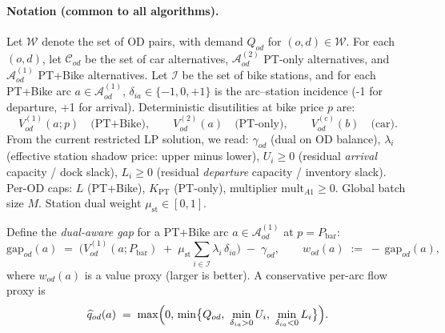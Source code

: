 \documentclass[11pt,a4paper]{article}
\begin{document}
\paragraph{Notation (common to all algorithms).}
Let $\mathcal{W}$ denote the set of OD pairs, with demand $Q_{od}$ for $(o,d)\in\mathcal{W}$.
For each $(o,d)$, let $\mathcal{C}_{od}$ be the set of car alternatives,
$\mathcal{A}^{(2)}_{od}$ PT-only alternatives, and $\mathcal{A}^{(1)}_{od}$ PT+Bike alternatives.
Let $\mathcal{I}$ be the set of bike stations, and for each PT+Bike arc $a\in\mathcal{A}^{(1)}_{od}$,
$\delta_{ia}\in\{-1,0,+1\}$ is the arc--station incidence (-1 for departure, +1 for arrival).
Deterministic disutilities at bike price $p$ are:
\[
V^{(1)}_{od}(a;p)\quad\text{(PT+Bike)},\qquad
V^{(2)}_{od}(a)\quad\text{(PT-only)},\qquad
V^{(c)}_{od}(b)\quad\text{(car)}.
\]
From the current restricted LP solution, we read:
$\gamma_{od}$ (dual on OD balance),
$\lambda_i$ (effective station shadow price: upper minus lower),
$U_i\ge 0$ (residual \emph{arrival} capacity / dock slack),
$L_i\ge 0$ (residual \emph{departure} capacity / inventory slack).
Per-OD caps: $L$ (PT+Bike), $K_{\mathrm{PT}}$ (PT-only), multiplier $\mathrm{mult}_{A1}\ge 0$.
Global batch size $M$.
Station dual weight $\mu_{\mathrm{st}}\in[0,1]$.

Define the \emph{dual-aware gap} for a PT+Bike arc $a\in\mathcal{A}^{(1)}_{od}$ at $p=P_{\mathrm{bar}}$:
\[
\mathrm{gap}_{od}(a)\;=\;\Big(V^{(1)}_{od}(a;P_{\mathrm{bar}})
\;+\;\mu_{\mathrm{st}}\sum_{i\in\mathcal{I}}\lambda_i\,\delta_{ia}\Big) \;-\; \gamma_{od},
\qquad
w_{od}(a)\;:=\; -\,\mathrm{gap}_{od}(a),
\]
where $w_{od}(a)$ is a value proxy (larger is better).
A conservative per-arc flow proxy is
\[
\widehat q_{od}(a)\;=\;
\max\Bigl(0,\,\min\bigl\{Q_{od},\ \min_{\delta_{ia}>0} U_i,\ \min_{\delta_{ia}<0} L_i\bigr\}\Bigr).
\]
\end{document}

